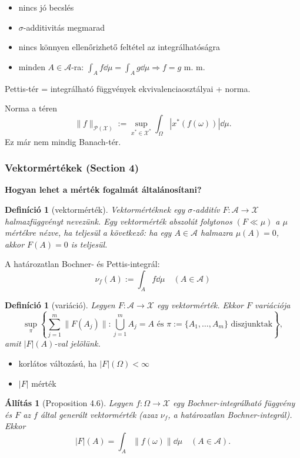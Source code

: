 \documentclass{beamer} %
\newtheorem{defi}[lem]{Definíció}
\newtheorem{allitas}[lem]{Állítás}
\begin{document}
\begin{frame}
\justifying
\begin{itemize}
\item nincs jó becslés
\pause \item $\sigma$-additivitás megmarad
\pause \item nincs könnyen ellenőrizhető feltétel az integrálhatóságra
\pause \item minden $A \in \mathcal{A}$-ra: $\int_{A} f \dd{\mu} = \int_{A} g \dd{\mu} \Longrightarrow f = g$ m. m.
\end{itemize}
\pause Pettis-tér = integrálható függvények ekvivalenciaosztályai + norma.

\pause Norma a téren 
$$
\|f\|_{\mathcal{P}(\mathcal{X})} := \sup_{x^* \in \mathcal{X}^*} \int_{\Omega} | x^*(f(\omega)) | \dd{\mu}.
$$
\pause Ez már nem mindig Banach-tér.
\end{frame}

\begin{frame}
\justifying
\frametitle{Vektormértékek (Section 4)}
\textbf{Hogyan lehet a mérték fogalmát általánosítani?}
\pause \begin{defi}[vektormérték]Vektormértéknek egy $\sigma$-additív  $F \colon \mathcal{A} \to \mathcal{X}$ halmazfüggvényt nevezünk. Egy vektormérték abszolút folytonos $(F \ll \mu)$ a $\mu$ mértékre nézve, ha teljesül a következő: ha egy $A \in \mathcal{A}$ halmazra $\mu(A) = 0$, akkor $F(A)=0$ is teljesül.
\end{defi}
\pause A határozatlan Bochner- és Pettis-integrál:
$$\nu_f(A) := \int_{A} f \dd{\mu} \quad (A \in \mathcal{A})$$
\end{frame}

\begin{frame}
\justifying
\begin{defi}[variáció]
Legyen $F\colon \mathcal{A} \to \mathcal{X}$ egy vektormérték. Ekkor $F$ variációja
$$\sup_{\pi} \left\lbrace \sum^{m}_{j=1} \| F(A_j) \| : \bigcup^{m}_{j=1} A_j = A \text{ és } \pi := \lbrace A_1, \ldots, A_m \rbrace \text{ diszjunktak} \right\rbrace,$$
amit $|F|(A)$-val jelölünk.
\end{defi}
\begin{itemize}
\pause \item korlátos változású, ha $|F|(\Omega) < \infty$
\pause \item $|F|$ mérték
\end{itemize}
\pause \begin{allitas}[Proposition 4.6] Legyen $f \colon \Omega \to \mathcal{X}$ egy Bochner-integrálható függvény és $F$ az $f$ által generált vektormérték (azaz $\nu_f$, a határozatlan Bochner-integrál). Ekkor 
$$|F|(A) = \int_{A} \| f(\omega) \| \dd{\mu} \quad (A \in \mathcal{A}).$$
\end{allitas}
\end{frame}
\end{document}
